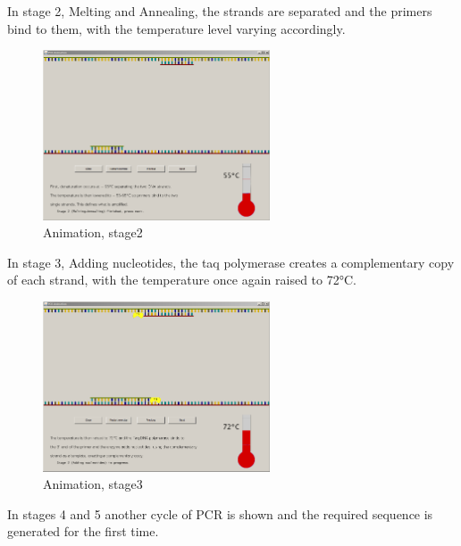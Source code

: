 In stage 2, Melting and Annealing, the strands are separated and the primers bind to them, with the temperature level varying accordingly.

\begin{figure}[h]
  \begin{center}
	\includegraphics[width=0.6\textwidth]{./images/AnimImpl/Stage2}
    \caption{
      \label{fig:AnimImpl:stage2}
      Animation, stage2
    }
  \end{center}
\end{figure}

In stage 3, Adding nucleotides, the taq polymerase creates a complementary copy of each strand, with the temperature once again raised to 72°C.

\begin{figure}[h]
  \begin{center}
	\includegraphics[width=0.6\textwidth]{./images/AnimImpl/Stage3}
    \caption{
      \label{fig:AnimImpl:stage3}
      Animation, stage3
    }
  \end{center}
\end{figure}

In stages 4 and 5 another cycle of PCR is shown and the required sequence is generated for the first time.

